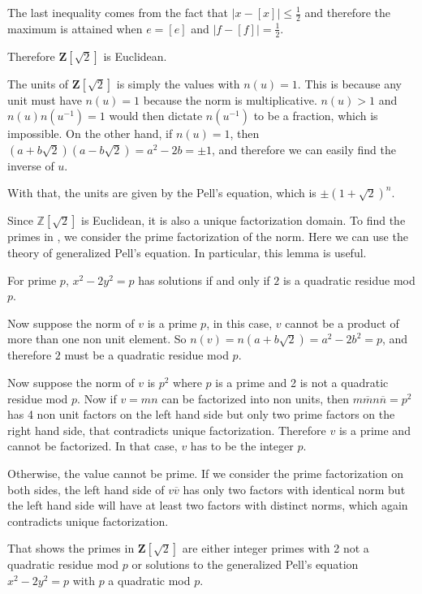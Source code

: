 The last inequality comes from the fact that $ |x - [x]| \le \frac{1}{2} $ and therefore the maximum is attained when $ e = [e] $ and $ |f - [f]| = \frac{1}{2} $.

Therefore $ \mathbf{Z}[\sqrt{2}] $ is Euclidean.

The units of $ \mathbf{Z}[\sqrt{2}] $ is simply the values with $ n(u) = 1 $. This is because any unit must have $ n(u) = 1 $ because the norm is multiplicative. $ n(u) > 1 $ and $ n(u)n(u^{-1}) = 1 $ would then dictate $ n(u^{-1}) $ to be a fraction, which is impossible. On the other hand, if $ n(u) = 1 $, then $ (a + b\sqrt{2})(a - b\sqrt{2}) = a^2 - 2b = \pm 1 $, and therefore we can easily find the inverse of $ u $. 

With that, the units are given by the Pell's equation, which is $ \pm(1+\sqrt{2})^n $.

Since $ \mathbb{Z}[\sqrt{2}] $ is Euclidean, it is also a unique factorization domain. To find the primes in , we consider the prime factorization of the norm. Here we can use the theory of generalized Pell's equation. In particular, this lemma is useful.

For prime $ p $, $ x^2 - 2y^2 = p $ has solutions if and only if $ 2 $ is a quadratic residue mod $ p $.

Now suppose the norm of $ v $ is a prime $ p $, in this case, $ v $ cannot be a product of more than one non unit element. So $ n(v) = n(a + b\sqrt{2}) = a^2 - 2b^2 = p $, and therefore $ 2 $ must be a quadratic residue mod $ p $.

Now suppose the norm of $ v $ is $ p^2 $ where $ p $ is a prime and 2 is not a quadratic residue mod $ p $. Now if $ v = mn $ can be factorized into non units, then $ m\overline{m}n\overline{n} = p^2 $ has 4 non unit factors on the left hand side but only two prime factors on the right hand side, that contradicts unique factorization. Therefore $ v $ is a prime and cannot be factorized. In that case, $ v $ has to be the integer $ p $.

Otherwise, the value cannot be prime. If we consider the prime factorization on both sides, the left hand side of $ v\overline{v} $ has only two factors with identical norm but the left hand side will have at least two factors with distinct norms, which again contradicts unique factorization.

That shows the primes in $ \mathbf{Z}[\sqrt{2}] $ are either integer primes with 2 not a quadratic residue mod $ p $ or solutions to the generalized Pell's equation $ x^2 - 2y^2 = p $ with $ p $ a quadratic mod $ p $.